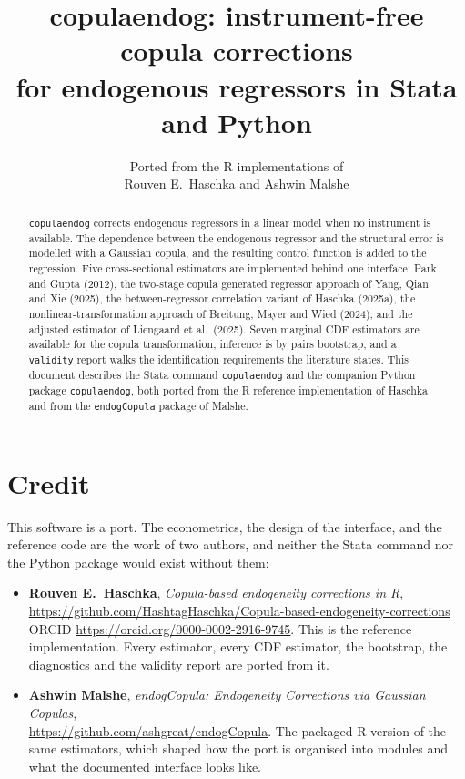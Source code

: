 \documentclass[11pt]{article}
\title{\textbf{copulaendog}: instrument-free copula corrections\\
       for endogenous regressors in Stata and Python}
\author{Ported from the R implementations of\\
        Rouven E.\ Haschka and Ashwin Malshe}
\date{}
\newcommand{\stcmd}[1]{\texttt{#1}}
\begin{document}
\maketitle

\begin{abstract}
\noindent
\stcmd{copulaendog} corrects endogenous regressors in a linear model when no
instrument is available. The dependence between the endogenous regressor and
the structural error is modelled with a Gaussian copula, and the resulting
control function is added to the regression. Five cross-sectional estimators
are implemented behind one interface: Park and Gupta (2012), the two-stage
copula generated regressor approach of Yang, Qian and Xie (2025), the
between-regressor correlation variant of Haschka (2025a), the
nonlinear-transformation approach of Breitung, Mayer and Wied (2024), and the
adjusted estimator of Liengaard et al.\ (2025). Seven marginal CDF estimators
are available for the copula transformation, inference is by pairs bootstrap,
and a \stcmd{validity} report walks the identification requirements the
literature states. This document describes the Stata command
\stcmd{copulaendog} and the companion Python package \stcmd{copulaendog}, both
ported from the R reference implementation of Haschka and from the
\stcmd{endogCopula} package of Malshe.
\end{abstract}

\section{Credit}

This software is a port. The econometrics, the design of the interface, and
the reference code are the work of two authors, and neither the Stata command
nor the Python package would exist without them:

\begin{itemize}[leftmargin=1.4em,itemsep=0.3em]
\item \textbf{Rouven E.\ Haschka}, \emph{Copula-based endogeneity corrections
      in R}, \\
      \url{https://github.com/HashtagHaschka/Copula-based-endogeneity-corrections} \\
      ORCID \url{https://orcid.org/0000-0002-2916-9745}. This is the reference
      implementation. Every estimator, every CDF estimator, the bootstrap, the
      diagnostics and the validity report are ported from it.
\item \textbf{Ashwin Malshe}, \emph{endogCopula: Endogeneity Corrections via
      Gaussian Copulas}, \\
      \url{https://github.com/ashgreat/endogCopula}. The packaged R version of
      the same estimators, which shaped how the port is organised into modules
      and what the documented interface looks like.
\end{itemize}
\end{document}

